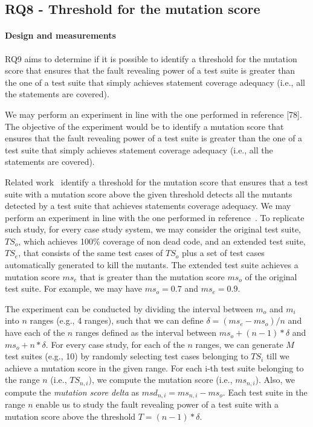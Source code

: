 \subsection{RQ8 - Threshold for the mutation score}

\paragraph{Design and measurements}
\label{sec:exp:thr}

RQ9 aims to determine if it is possible to identify a threshold for the mutation score that ensures that the fault revealing power of a test suite is greater than the one of a test suite that simply achieves statement coverage adequacy (i.e., all the statements are covered).


We may perform an experiment in line with the one performed in reference [78]. The objective of the experiment would be to identify a mutation score that ensures that the fault revealing power of a test suite is greater than the one of a test suite that simply achieves statement coverage adequacy (i.e., all the statements are covered). 

Related work~\cite{CChekam:17} identify a threshold for the mutation score that ensures that a test suite with a mutation score above the given threshold detects all the mutants detected by a test suite that achieves statements coverage adequacy. 
We may perform an experiment in line with the one performed in reference~\cite{CChekam:17}.
To replicate such study, for every case study system, we may consider the original test suite, $\mathit{TS}_o$, which achieves 100\% coverage of non dead code, and an extended test suite, $\mathit{TS}_e$, that consists of the same test cases of $\mathit{TS}_o$ plus a set of test cases automatically generated to kill the mutants. The extended test suite achieves a mutation score $ms_e$ that is greater than the mutation score $\mathit{ms}_o$ of the original test suite. For example, we may have $\mathit{ms}_o=0.7$ and $\mathit{ms}_e=0.9$.

The experiment can be conducted by dividing the interval between $m_o$ and $m_i$ into $n$ ranges (e.g., 4 ranges), such that we can define $\delta = (\mathit{ms}_e - \mathit{ms}_o)/n$ and have each of the $n$ ranges defined as the interval between $\mathit{ms}_o+(n-1)*\delta$ and $\mathit{ms}_o+n*\delta$.
For every case study, for each of the $n$ ranges, we can generate $M$ test suites  (e.g., 10) by randomly selecting test cases belonging to $\mathit{TS}_i$ till we achieve a mutation score in the given range.
For each i-th test suite belonging to the range $n$ (i.e., $\mathit{TS}_{n,i}$), we compute the mutation score (i.e., $ms_{n,i}$).
Also, we compute the \emph{mutation score delta} as $msd_{n,i}=ms_{n,i}-ms_o$. Each test suite in the range $n$ enable us to study the fault revealing power of a test suite with a mutation score above the threshold $T=(n-1)*\delta$.

